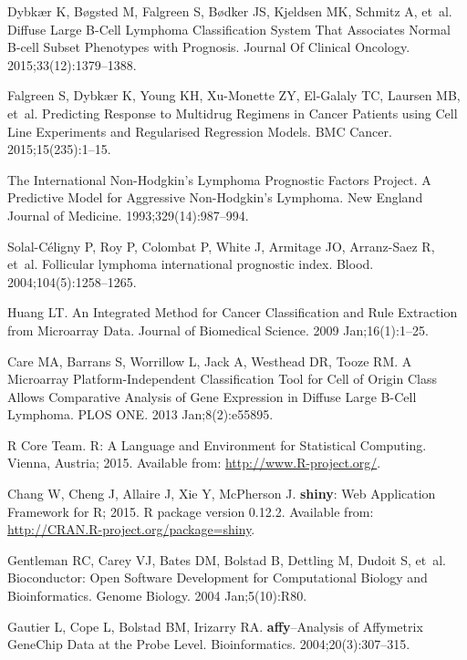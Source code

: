 \documentclass[10pt,letterpaper]{article}
\newcommand{\R}{\textsf{R}}
\newcommand{\pkg}[1]{\textbf{#1}}
\begin{document}
\begin{thebibliography}{10}
Dybk\ae{}r K, B\o{}gsted M, Falgreen S, B\o{}dker JS, Kjeldsen MK, Schmitz A,
  et~al.
\newblock Diffuse Large {B}-Cell Lymphoma Classification System That Associates
  Normal {B}-cell Subset Phenotypes with Prognosis.
\newblock Journal Of Clinical Oncology. 2015;33(12):1379--1388.

Falgreen S, Dybk{\ae}r K, Young KH, Xu-Monette ZY, El-Galaly TC, Laursen MB,
  et~al.
\newblock Predicting Response to Multidrug Regimens in Cancer Patients using
  Cell Line Experiments and Regularised Regression Models.
\newblock BMC Cancer. 2015;15(235):1--15.

{The International Non-Hodgkin's Lymphoma Prognostic Factors Project}.
\newblock A Predictive Model for Aggressive Non-Hodgkin's Lymphoma.
\newblock New England Journal of Medicine. 1993;329(14):987--994.

Solal-C{\'e}ligny P, Roy P, Colombat P, White J, Armitage JO, Arranz-Saez R,
  et~al.
\newblock Follicular lymphoma international prognostic index.
\newblock Blood. 2004;104(5):1258--1265.

Huang LT.
\newblock An Integrated Method for Cancer Classification and Rule Extraction
  from Microarray Data.
\newblock Journal of Biomedical Science. 2009 Jan;16(1):1--25.

Care MA, Barrans S, Worrillow L, Jack A, Westhead DR, Tooze RM.
\newblock A Microarray Platform-Independent Classification Tool for Cell of
  Origin Class Allows Comparative Analysis of Gene Expression in Diffuse Large
  {B}-Cell Lymphoma.
\newblock PLOS ONE. 2013 Jan;8(2):e55895.

{\R{} Core Team}. {\R}: A Language and Environment for Statistical Computing.
\newblock Vienna, Austria; 2015.
\newblock Available from: \url{http://www.R-project.org/}.

Chang W, Cheng J, Allaire J, Xie Y, McPherson J. \pkg{shiny}: Web Application
  Framework for R; 2015.
\newblock \R{} package version 0.12.2.
\newblock Available from: \url{http://CRAN.R-project.org/package=shiny}.

Gentleman RC, Carey VJ, Bates DM, Bolstad B, Dettling M, Dudoit S, et~al.
\newblock Bioconductor: Open Software Development for Computational Biology and
  Bioinformatics.
\newblock Genome Biology. 2004 Jan;5(10):R80.

Gautier L, Cope L, Bolstad BM, Irizarry RA.
\newblock \pkg{affy}--Analysis of Affymetrix GeneChip Data at the Probe Level.
\newblock Bioinformatics. 2004;20(3):307--315.


\end{thebibliography}
\end{document}
